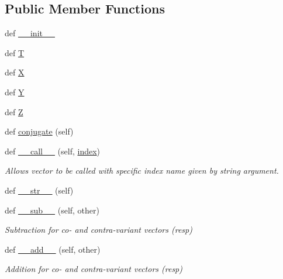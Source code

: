 \subsection*{Public Member Functions}
\begin{DoxyCompactItemize}
\item 
def \hyperlink{class_py_spinor_1_1_lorentz_vector_1_1_lorentz_vector_aae8d47664e6e334ffc3765e081f77c4f}{\+\_\+\+\_\+init\+\_\+\+\_\+}
\item 
def \hyperlink{class_py_spinor_1_1_lorentz_vector_1_1_lorentz_vector_a8adef627e38fbef234c90de0378bdf40}{T}
\item 
def \hyperlink{class_py_spinor_1_1_lorentz_vector_1_1_lorentz_vector_abb4ed2b7f72ceea64756d9e27ef59e3a}{X}
\item 
def \hyperlink{class_py_spinor_1_1_lorentz_vector_1_1_lorentz_vector_ac2449f2d40ae954dc7be2e3ab335ad18}{Y}
\item 
def \hyperlink{class_py_spinor_1_1_lorentz_vector_1_1_lorentz_vector_ad05ad87908b5c645af2ae67cbf5ea269}{Z}
\item 
def \hyperlink{class_py_spinor_1_1_lorentz_vector_1_1_lorentz_vector_a89043007a937453bbc9adc76fa4d3276}{conjugate} (self)
\item 
def \hyperlink{class_py_spinor_1_1_lorentz_vector_1_1_lorentz_vector_a83544cd8c242999f7be5cfc29e61e31c}{\+\_\+\+\_\+call\+\_\+\+\_\+} (self, \hyperlink{class_py_spinor_1_1_lorentz_vector_1_1_lorentz_vector_a11da34cf107e38100b3bfb509eac2d1f}{index})
\begin{DoxyCompactList}\small\item\em Allows vector to be called with specific index name given by string argument. \end{DoxyCompactList}\item 
def \hyperlink{class_py_spinor_1_1_lorentz_vector_1_1_lorentz_vector_af7e9f0d16494f38a0c8aab1290e73b51}{\+\_\+\+\_\+str\+\_\+\+\_\+} (self)
\item 
def \hyperlink{class_py_spinor_1_1_lorentz_vector_1_1_lorentz_vector_ab127e64670ad904cd9fc85afdf78cd79}{\+\_\+\+\_\+sub\+\_\+\+\_\+} (self, other)
\begin{DoxyCompactList}\small\item\em Subtraction for co-\/ and contra-\/variant vectors (resp) \end{DoxyCompactList}\item 
def \hyperlink{class_py_spinor_1_1_lorentz_vector_1_1_lorentz_vector_aa0925be56ef69c512eb861129b37fcb0}{\+\_\+\+\_\+add\+\_\+\+\_\+} (self, other)
\begin{DoxyCompactList}\small\item\em Addition for co-\/ and contra-\/variant vectors (resp) \end{DoxyCompactList}\item 

\end{DoxyCompactItemize}

